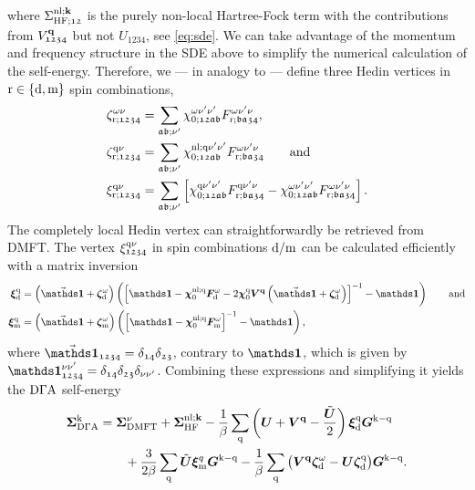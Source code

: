 \documentclass[../../main.tex]{subfiles}
\begin{document}
where $\Sigma_{\text{HF};\mathfrak{12}}^{\text{nl};\textbf{k}}$ is the purely non-local Hartree-Fock term with the contributions from $V^{\textbf{q}}_{\mathfrak{1234}}$ but not $U_{\mathfrak{1234}}$, see \eqref{eq:sde}. We can take advantage of the momentum and frequency structure in the SDE above to simplify the numerical calculation of the self-energy. Therefore, we --- in analogy to \cite{ab initio dga} --- define three Hedin vertices in $\text{r}\in\{\text{d},\text{m}\}$ spin combinations,
\begin{align}\label{eq:three_leg_vertices_abinitio_dga}
	\zeta_{\text{r};\mathfrak{1234}}^{\omega\nu}&=\sum_{\mathfrak{ab;\nu'}}\chi_{0;\mathfrak{12ab}}^{\omega\nu'\nu'}F_{\text{r};\mathfrak{ba34}}^{\omega\nu'\nu},\\
	\zeta_{\text{r};\mathfrak{1234}}^{\text{q}\nu}&=\sum_{\mathfrak{ab;\nu'}}\chi_{0;\mathfrak{12ab}}^{\text{nl};\text{q}\nu'\nu'}F_{\text{r};\mathfrak{ba34}}^{\omega\nu'\nu}\qquad\text{and}\\
	\xi_{\text{r};\mathfrak{1234}}^{\text{q}\nu}&=\sum_{\mathfrak{ab;\nu'}}\left [\chi_{0;\mathfrak{12ab}}^{\text{q}\nu'\nu'}F_{\text{r};\mathfrak{ba34}}^{\text{q}\nu'\nu}-\chi_{0;\mathfrak{12ab}}^{\omega\nu'\nu'}F_{\text{r};\mathfrak{ba34}}^{\omega\nu'\nu}\right ].
\end{align}
The completely local Hedin vertex can straightforwardly be retrieved from DMFT. The vertex $\xi_{\mathfrak{1234}}^{\text{q}\nu}$ in spin combinations $\text{d}/\text{m}$ can be calculated efficiently with a matrix inversion
\begin{subequations}
\begin{align}
	\bm\xi_{\dens}^{\q}&=\left (\vec{\bm\unity}+\bm\zeta_{\dens}^{\omega}\right )\left (\left [\bm\unity-\bm\chi_{0}^{\nl;\q}\bm F_{\dens}^{\omega}-2\bm\chi_{0}^{\q}\bm V^{\vv{q}}\left (\vec{\bm\unity}+\bm\zeta_{\dens}^{\omega}\right )\right ]^{-1}-\bm\unity\right )\qqand\\
	\bm\xi_{\magn}^{\q}&=\left (\vec{\bm\unity}+\bm\zeta_{\magn}^{\omega}\right )\left (\left [\bm\unity-\bm\chi_{0}^{\nl;\q}\bm F_{\magn}^{\omega}\right ]^{-1}-\bm\unity\right ),
\end{align}
\end{subequations}
where $\vec{\bm\unity}_{\mathfrak{1234}}=\delta_{\mathfrak{14}}\delta_{\mathfrak{23}}$, contrary to $\bm\unity$, which is given by $\bm\unity_{\mathfrak{1234}}^{\nu\nu'}=\delta_{\mathfrak{14}}\delta_{\mathfrak{23}}\delta_{\nu\nu'}$. Combining these expressions and simplifying it \cite{ab initio dga} yields the $\text{D}\Gamma\text{A}$ self-energy
\begin{align}\label{eq:sde_abinitio_dga}
\begin{split}
	\bm\Sigma_{\text{D}\Gamma\text{A}}^{\text{k}}&=\bm\Sigma_{\text{DMFT}}^{\nu}+\bm\Sigma_{\text{HF}}^{\text{nl};\textbf{k}}-\frac1\beta\sum_{\text{q}}\left (\bm U + \bm V^{\textbf{q}}-\frac{\tilde{\bm U}}{2}\right )\bm\xi_{\text{d}}^{\text{q}}\bm G^{\text{k}-\text{q}}\\
	&\qquad+\frac{3}{2\beta}\sum_{\text{q}}\tilde{\bm U}\bm\xi_{\text{m}}^{q}\bm G^{\text{k}-\text{q}}-\frac1\beta\sum_{\text{q}}\big (\bm V^{\textbf{q}}\bm\zeta_{\text{d}}^{\omega}-\bm U\bm\zeta_{\text{d}}^{\text{q}}\big )\bm G^{\text{k}-\text{q}}.
\end{split}
\end{align}
\end{document}
